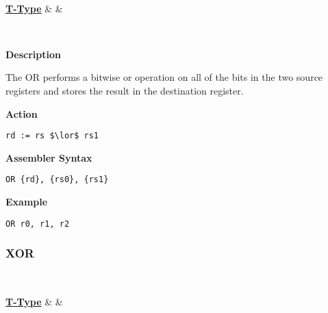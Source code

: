 \vspace{3ex}

\begin{center}
	\begin{bytefield}[leftcurly=., leftcurlyspace=0pt]{32}
		 \\
		\begin{leftwordgroup}{\hyperref[sec:t-type]{\textbf{T-Type}}}
			 & 
			 &
		\end{leftwordgroup}\\
	\end{bytefield}
\end{center}

\textbf{Description}

The OR performs a bitwise or operation on all of the bits in the two source registers and stores the result in the destination register.

\vspace{3ex}

\textbf{Action}
\begin{lstlisting}[frame=single]
	rd := rs $\lor$ rs1
\end{lstlisting}

\vspace{3ex}

\textbf{Assembler Syntax}
\begin{lstlisting}[frame=single]
	OR {rd}, {rs0}, {rs1}
\end{lstlisting}

\vspace{3ex}

\textbf{Example}
\begin{lstlisting}[frame=single]
	OR r0, r1, r2
\end{lstlisting}

\subsubsection{XOR }\label{sec:XOR}

\vspace{3ex}

\begin{center}
	\begin{bytefield}[leftcurly=., leftcurlyspace=0pt]{32}
		 \\
		\begin{leftwordgroup}{\hyperref[sec:t-type]{\textbf{T-Type}}}
			 & 
			 &
		\end{leftwordgroup}\\
	\end{bytefield}
\end{center}

